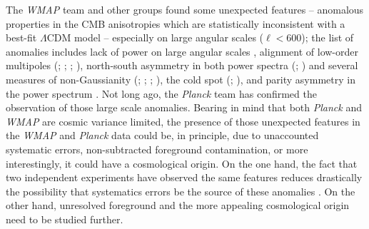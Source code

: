 The \textit{WMAP} team \cite{Spergel2003b} and other groups found some unexpected features -- anomalous properties in the CMB anisotropies which are statistically inconsistent with a best-fit $\Lambda$CDM model -- especially on large angular scales ($\ell < 600$); the list of anomalies includes lack of power on large angular scales \cite{Copi2007}, alignment of low-order multipoles (\cite{Tegmark2003}; \cite{Schwarz2004}; \cite{Bielewicz2005}; \cite{Land2005}), north-south asymmetry in both power spectra (\cite{Eriksen2004}; \cite{Hansen2009}) and several measures of non-Gaussianity (\cite{Eriksen2004a}; \cite{Eriksen2005}; \cite{Rath2007}; \cite{Rath2009}), the cold spot (\cite{Vielva2004}; \cite{Cruz2005}), and parity asymmetry in the power spectrum \cite{Kim2010a}. Not long ago, the \textit{Planck} team has confirmed the observation of those large scale anomalies. Bearing in mind that both \textit{Planck} and \textit{WMAP} are cosmic variance limited, the presence of those unexpected features in the \textit{WMAP} and \textit{Planck} data could be, in principle, due to unaccounted systematic errors, non-subtracted foreground contamination, or more interestingly, it could have a cosmological origin. On the one hand, the fact that two independent experiments have observed the same features reduces drastically the possibility that systematics errors be the source of these anomalies \cite{Larson2014}. On the other hand, unresolved foreground and the more appealing cosmological origin need to be studied further. 

